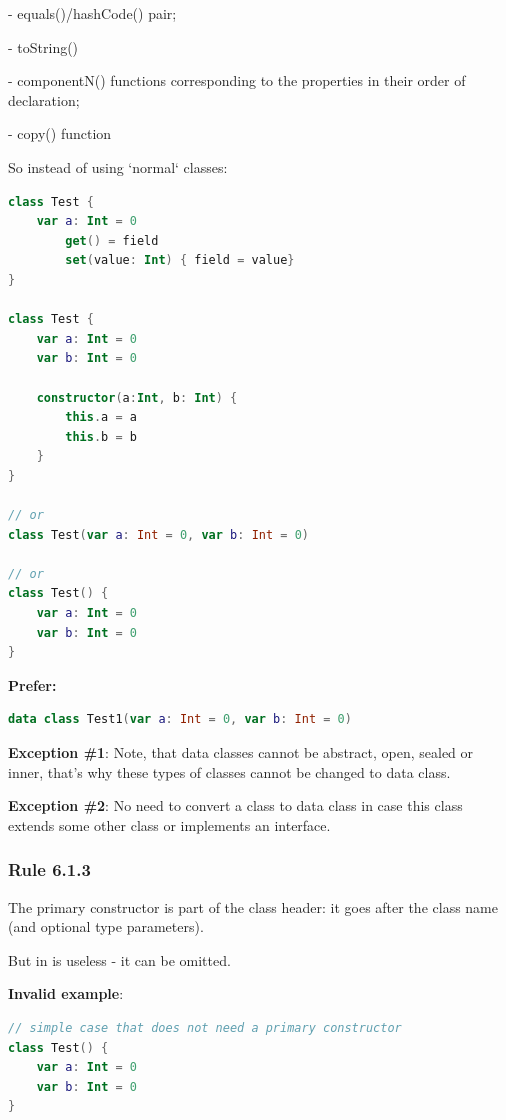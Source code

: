 {{{{- equals()/hashCode() pair;

- toString()

- componentN() functions corresponding to the properties in their order of declaration;

- copy() function



So instead of using `normal` classes:



\begin{lstlisting}[language=Kotlin]
class Test {
    var a: Int = 0
        get() = field
        set(value: Int) { field = value}
}

class Test {
    var a: Int = 0
    var b: Int = 0

    constructor(a:Int, b: Int) {
        this.a = a
        this.b = b
    }
}

// or
class Test(var a: Int = 0, var b: Int = 0)

// or
class Test() {
    var a: Int = 0
    var b: Int = 0
}
\end{lstlisting}


\textbf{Prefer:}

\begin{lstlisting}[language=Kotlin]
data class Test1(var a: Int = 0, var b: Int = 0)
\end{lstlisting}


\textbf{Exception \#1}: Note, that data classes cannot be abstract, open, sealed or inner, that's why these types of classes cannot be changed to data class.



\textbf{Exception \#2}: No need to convert a class to data class in case this class extends some other class or implements an interface.



\subsubsection*{\textbf{Rule 6.1.3}}
\leavevmode\newline

The primary constructor is part of the class header: it goes after the class name (and optional type parameters).

But in is useless - it can be omitted.



\textbf{Invalid example}:

\begin{lstlisting}[language=Kotlin]
// simple case that does not need a primary constructor
class Test() {
    var a: Int = 0
    var b: Int = 0
}


\end{lstlisting}}}}}
